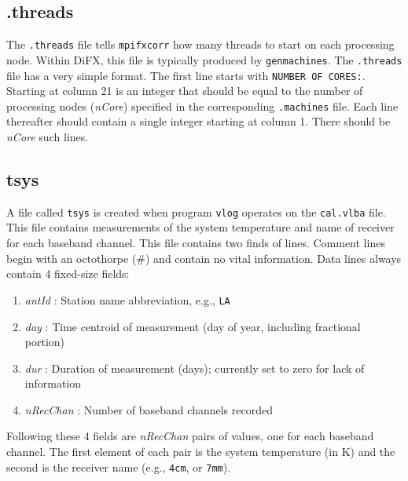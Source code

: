 
\subsection{.threads} \label{sec:threads}

The {\tt .threads} file tells {\tt mpifxcorr} how many threads to start on each processing node.
Within DiFX, this file is typically produced by {\tt genmachines}.
The {\tt.threads} file has a very simple format.
The first line starts with {\tt NUMBER OF CORES:}.
Starting at column 21 is an integer that should be equal to the number of processing nodes ({\em nCore}) specified in the corresponding {\tt .machines} file.
Each line thereafter should contain a single integer starting at column 1.
There should be {\em nCore} such lines.









\subsection{tsys} \label{sec:tsys}

A file called {\tt tsys} is created when program {\tt vlog} operates on the {\tt cal.vlba} file.
This file contains measurements of the system temperature and name of receiver for each baseband channel.
This file contains two finds of lines.
Comment lines begin with an octothorpe (\#) and contain no vital information.
Data lines always contain 4 fixed-size fields:
\begin{enumerate}
\item {\em antId} : Station name abbreviation, e.g., {\tt LA}
\item {\em day} : Time centroid of measurement (day of year, including fractional portion)
\item {\em dur} : Duration of measurement (days); currently set to zero for lack of information
\item {\em nRecChan} : Number of baseband channels recorded 
\end{enumerate}
Following these 4 fields are {\em nRecChan} pairs of values, one for each baseband channel.
The first element of each pair is the system temperature (in K) and the second is the receiver name (e.g., {\tt 4cm}, or {\tt 7mm}).

